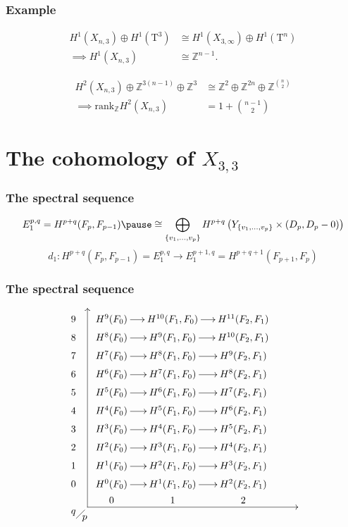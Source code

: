 \documentclass{beamer} %
\newcommand{\Z}{\mathbb{Z}}
\newcommand{\T}{\mathrm{T}}
\newcommand{\set}[1]{\left\{ #1 \right\}}
\begin{document}
\begin{frame}
  \frametitle{Example}
  \begin{example}[$k=1$]
    \begin{align*}
      H^1(X_{n,3}) \oplus H^1(\T^3) &\cong H^1(X_{3,\infty}) \oplus
                                      H^1(\T^n) \\
      \implies H^1(X_{n,3}) &\cong \Z^{n-1}.
    \end{align*}
  \end{example}
  \pause
  \begin{example}[$k=2$]
    \begin{align*}
      H^2(X_{n,3})\oplus \Z^{3(n-1)}\oplus \Z^{3}
      &\cong \Z^2 \oplus \Z^{2n} \oplus \Z^{n\choose 2}\\
      \implies \mathrm{rank}_{\Z}H^2(X_{n,3}) &= 1 + {n-1 \choose 2}
    \end{align*}
  \end{example}
\end{frame}

\appendix

\section{The cohomology of $X_{3,3}$}

\begin{frame}
  \frametitle{The spectral sequence}
  \[ E_1^{p,q} = H^{p+q}(F_p,F_{p-1}) \pause\cong
  \bigoplus_{\set{v_1,\dots,v_p}}
  H^{p+q}\left(Y_{\set{v_1,\dots,v_p}} \times (D_p,D_p-0)\right)\] \pause
  \[ d_1 : H^{p+q}(F_p,F_{p-1}) = E_1^{p,q} \to E_1^{p+1,q} =
  H^{p+q+1}(F_{p+1},F_p) \]
\end{frame}

\begin{frame}[shrink]
  \frametitle{The spectral sequence}
  \[ \xy
  (5,4); (5,-67); **\dir{-}; (5,4); *\dir{>};
  (5,-67); (80,-67); **\dir{-}; *\dir{<};
  (0,-69)*{q}; (4,-71)*{p};
  (1,-71); (4,-68); **\dir{-};
  (0,0)\xymatrix@R=0.2em@C=1.4em{
    9 & H^{9}(F_0) \ar[r] & H^{10}(F_1,F_0) \ar[r] & H^{11}(F_2,F_1) \\
    8 & H^{8}(F_0) \ar[r] & H^{9}(F_1,F_0) \ar[r] & H^{10}(F_2,F_1) \\
    7 & H^{7}(F_0) \ar[r] & H^{8}(F_1,F_0) \ar[r] & H^{9}(F_2,F_1) \\
    6 & H^{6}(F_0) \ar[r] & H^{7}(F_1,F_0) \ar[r] & H^{8}(F_2,F_1) \\
    5 & H^{5}(F_0) \ar[r] & H^{6}(F_1,F_0) \ar[r] & H^{7}(F_2,F_1) \\
    4 & H^{4}(F_0) \ar[r] & H^{5}(F_1,F_0) \ar[r] & H^{6}(F_2,F_1) \\
    3 & H^{3}(F_0) \ar[r] & H^{4}(F_1,F_0) \ar[r] & H^{5}(F_2,F_1) \\
    2 & H^{2}(F_0) \ar[r] & H^{3}(F_1,F_0) \ar[r] & H^{4}(F_2,F_1) \\
    1 & H^{1}(F_0) \ar[r] & H^{2}(F_1,F_0) \ar[r] & H^{3}(F_2,F_1) \\
    0 & H^{0}(F_0) \ar[r] & H^{1}(F_1,F_0) \ar[r] & H^{2}(F_2,F_1) \\
    & 0 & 1 & 2
  } \endxy \]
\end{frame}
\end{document}
